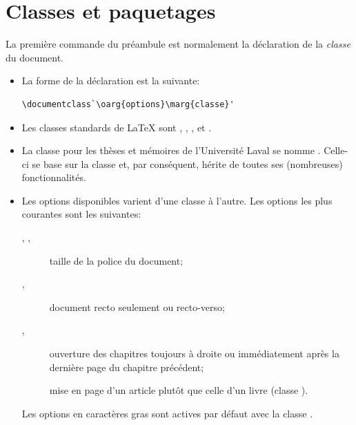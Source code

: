 \section{Classes et paquetages}

La première commande du préambule est normalement la déclaration de la
\emph{classe} du document.
\begin{itemize}
\item La forme de la déclaration est la suivante:
\begin{lstlisting}
\documentclass`\oarg{options}\marg{classe}'
\end{lstlisting}
\item Les classes standards de {\LaTeX} sont ,
  , ,  et .
\item La classe pour les thèses et mémoires de l'Université Laval se
  nomme . Celle-ci se base sur la classe 
  et, par conséquent, hérite de toutes ses (nombreuses)
  fonctionnalités.
\item Les options disponibles varient d'une classe à l'autre. Les
  options les plus courantes sont les suivantes:
  \begin{description}
  \item[\code{10pt}, \textbf{\code{11pt}}, \code{12pt}] taille de la
    police du document;
  \item[\textbf{}, ] document recto
    seulement ou recto-verso;
  \item[\textbf{}, ] ouverture des
    chapitres toujours à droite ou immédiatement après la dernière
    page du chapitre précédent;
  \item[] mise en page d'un article plutôt que celle
    d'un livre (classe ).
  \end{description}
  Les options en caractères gras sont actives par défaut avec la
  classe .
\end{itemize}

